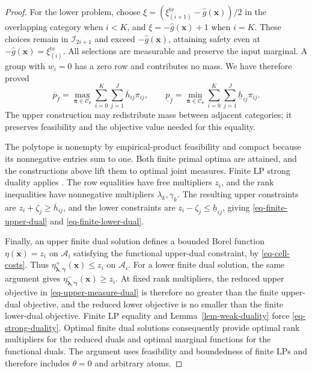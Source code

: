 \documentclass[review,11pt,3p,authoryear,nopreprintline]{elsarticle}
\begin{document}
\begin{proof}
  For the lower problem, choose
  $\xi=\left(\xi_{(i+1)}^{\mathrm{te}}-\hat g(\bm x)\right)/2$ in the overlapping category when $i<K$, and $\xi=-\hat g(\bm x)+1$ when $i=K$. These choices remain in $\mathcal I_{2i+1}$ and exceed $-\hat g(\bm x)$, attaining safety even at $-\hat g(\bm x)=\xi_{(i)}^{\mathrm{te}}$. All selections are measurable and preserve the input marginal. A group with $w_i=0$ has a zero row and contributes no mass. We have therefore proved
  \begin{equation}
    \overline p_{\hat f}
    =\max_{\bm\pi\in\mathcal C_\theta}\sum_{i=0}^K\sum_{j=1}^J
      \overline h_{ij}\pi_{ij},\qquad
    \underline p_{\hat f}
    =\min_{\bm\pi\in\mathcal C_\theta}\sum_{i=0}^K\sum_{j=1}^J
      \underline h_{ij}\pi_{ij}.
    \label{eq-finite-primal-values}
  \end{equation}
  The upper construction may redistribute mass between adjacent categories; it preserves feasibility and the objective value needed for this equality.

  The polytope is nonempty by empirical-product feasibility and compact because its nonnegative entries sum to one. Both finite primal optima are attained, and the constructions above lift them to optimal joint measures. Finite LP strong duality applies \citep[Section~5.2.3]{B.V04}. The row equalities have free multipliers $z_i$, and the rank inequalities have nonnegative multipliers $\lambda_k,\gamma_k$. The resulting upper constraints are $z_i+\zeta_j\ge\overline h_{ij}$, and the lower constraints are $z_i-\zeta_j\le\underline h_{ij}$, giving \eqref{eq-finite-upper-dual} and \eqref{eq-finite-lower-dual}.

  Finally, an upper finite dual solution defines a bounded Borel function $\eta(\bm x)=z_i$ on $\mathcal A_i$ satisfying the functional upper-dual constraint, by \eqref{eq-cell-costs}. Thus $\eta^+_{\bm\lambda,\bm\gamma}(\bm x)\le z_i$ on $\mathcal A_i$. For a lower finite dual solution, the same argument gives $\eta^-_{\bm\lambda,\bm\gamma}(\bm x)\ge z_i$. At fixed rank multipliers, the reduced upper objective in \eqref{eq-upper-measure-dual} is therefore no greater than the finite upper-dual objective, and the reduced lower objective is no smaller than the finite lower-dual objective. Finite LP equality and Lemma~\ref{lem-weak-duality} force \eqref{eq-strong-duality}. Optimal finite dual solutions consequently provide optimal rank multipliers for the reduced duals and optimal marginal functions for the functional duals. The argument uses feasibility and boundedness of finite LPs and therefore includes $\theta=0$ and arbitrary atoms.
\end{proof}
\end{document}
